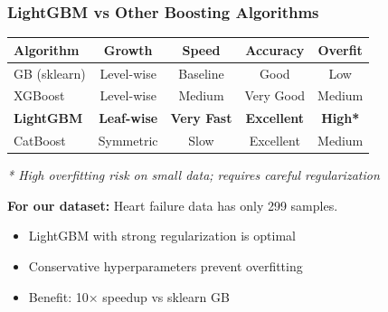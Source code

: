 \documentclass{beamer}
\begin{document}
\begin{frame}[fragile]
\frametitle{LightGBM vs Other Boosting Algorithms}

\begin{center}
{\small
\begin{tabular}{|l|c|c|c|c|}
\hline
\textbf{Algorithm} & \textbf{Growth} & \textbf{Speed} & \textbf{Accuracy} & \textbf{Overfit} \\
\hline
GB (sklearn) & Level-wise & Baseline & Good & Low \\
\hline
XGBoost & Level-wise & Medium & Very Good & Medium \\
\hline
\textbf{LightGBM} & \textbf{Leaf-wise} & \textbf{Very Fast} & \textbf{Excellent} & \textbf{High*} \\
\hline
CatBoost & Symmetric & Slow & Excellent & Medium \\
\hline
\end{tabular}
}
\end{center}

\vspace{0.3cm}
\textit{* High overfitting risk on small data; requires careful regularization}

\vspace{0.3cm}
\textbf{For our dataset:} Heart failure data has only 299 samples.

\begin{itemize}
    \item LightGBM with strong regularization is optimal
    \item Conservative hyperparameters prevent overfitting
    \item Benefit: 10× speedup vs sklearn GB
\end{itemize}

\end{frame}
\end{document}
